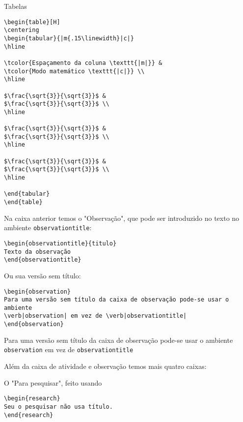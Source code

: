 \begin{task}{Tabelas}
\begin{verbatim}
\begin{table}[H]
\centering
\begin{tabular}{|m{.15\linewidth}|c|}
\hline

\tcolor{Espaçamento da coluna \texttt{|m|}} & 
\tcolor{Modo matemático \texttt{|c|}} \\
\hline

$\frac{\sqrt{3}}{\sqrt{3}}$ & 
$\frac{\sqrt{3}}{\sqrt{3}}$ \\
\hline

$\frac{\sqrt{3}}{\sqrt{3}}$ & 
$\frac{\sqrt{3}}{\sqrt{3}}$ \\
\hline

$\frac{\sqrt{3}}{\sqrt{3}}$ & 
$\frac{\sqrt{3}}{\sqrt{3}}$ \\
\hline

\end{tabular}
\end{table}
\end{verbatim}

\end{task}



Na caixa anterior temos o "Observação", que pode ser introduzido no texto no ambiente \verb|observationtitle|:
\begin{verbatim}
\begin{observationtitle}{titulo}
Texto da observação
\end{observationtitle}
\end{verbatim}
Ou sua versão sem título:

\begin{verbatim}
\begin{observation}
Para uma versão sem título da caixa de observação pode-se usar o ambiente
\verb|observation| em vez de \verb|observationtitle|
\end{observation}
\end{verbatim}

\begin{observation}
Para uma versão sem título da caixa de observação pode-se usar o ambiente \verb|observation| em vez de \verb|observationtitle|
\end{observation}

Além da caixa de atividade e observação temos mais quatro caixas:

\begin{research}
O "Para pesquisar", feito usando

\begin{verbatim}
\begin{research}
Seu o pesquisar não usa título.
\end{research}
\end{verbatim}
\end{research}

